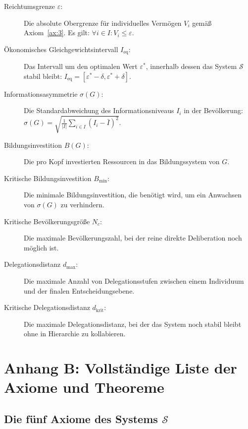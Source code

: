 \begin{description}
    \item[Reichtumsgrenze $\varepsilon$:] Die absolute Obergrenze für individuelles Vermögen $V_i$ gemäß Axiom~\ref{ax:3}. Es gilt: $\forall i \in I: V_i \leq \varepsilon$.
    
    \item[Ökonomisches Gleichgewichtsintervall $I_{\text{eq}}$:] Das Intervall um den optimalen Wert $\varepsilon^*$, innerhalb dessen das System $\mathcal{S}$ stabil bleibt: $I_{\text{eq}} = [\varepsilon^* - \delta, \varepsilon^* + \delta]$.
    
    \item[Informationsasymmetrie $\sigma(G)$:] Die Standardabweichung des Informationsniveaus $I_i$ in der Bevölkerung: $\sigma(G) = \sqrt{\frac{1}{|I|} \sum_{i \in I} (I_i - \bar{I})^2}$.
    
    \item[Bildungsinvestition $B(G)$:] Die pro Kopf investierten Ressourcen in das Bildungssystem von $G$.
    
    \item[Kritische Bildungsinvestition $B_{\min}$:] Die minimale Bildungsinvestition, die benötigt wird, um ein Anwachsen von $\sigma(G)$ zu verhindern.
    
    \item[Kritische Bevölkerungsgröße $N_c$:] Die maximale Bevölkerungszahl, bei der reine direkte Deliberation noch möglich ist.
    
    \item[Delegationsdistanz $d_{\text{max}}$:] Die maximale Anzahl von Delegationsstufen zwischen einem Individuum und der finalen Entscheidungsebene.
    
    \item[Kritische Delegationsdistanz $d_{\text{krit}}$:] Die maximale Delegationsdistanz, bei der das System noch stabil bleibt ohne in Hierarchie zu kollabieren.
\end{description}

\section*{Anhang B: Vollständige Liste der Axiome und Theoreme}
\label{anhang:axiome_theoreme}

\subsection*{Die fünf Axiome des Systems $\mathcal{S}$}

